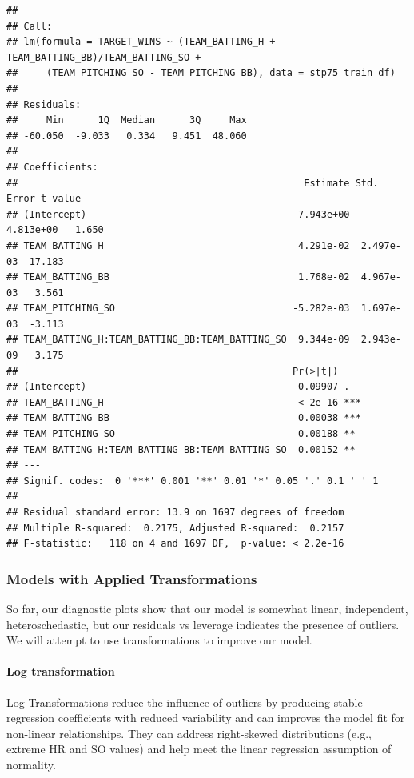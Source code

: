 \documentclass[
]{article}
\begin{document}
\begin{verbatim}
## 
## Call:
## lm(formula = TARGET_WINS ~ (TEAM_BATTING_H + TEAM_BATTING_BB)/TEAM_BATTING_SO + 
##     (TEAM_PITCHING_SO - TEAM_PITCHING_BB), data = stp75_train_df)
## 
## Residuals:
##     Min      1Q  Median      3Q     Max 
## -60.050  -9.033   0.334   9.451  48.060 
## 
## Coefficients:
##                                                  Estimate Std. Error t value
## (Intercept)                                     7.943e+00  4.813e+00   1.650
## TEAM_BATTING_H                                  4.291e-02  2.497e-03  17.183
## TEAM_BATTING_BB                                 1.768e-02  4.967e-03   3.561
## TEAM_PITCHING_SO                               -5.282e-03  1.697e-03  -3.113
## TEAM_BATTING_H:TEAM_BATTING_BB:TEAM_BATTING_SO  9.344e-09  2.943e-09   3.175
##                                                Pr(>|t|)    
## (Intercept)                                     0.09907 .  
## TEAM_BATTING_H                                  < 2e-16 ***
## TEAM_BATTING_BB                                 0.00038 ***
## TEAM_PITCHING_SO                                0.00188 ** 
## TEAM_BATTING_H:TEAM_BATTING_BB:TEAM_BATTING_SO  0.00152 ** 
## ---
## Signif. codes:  0 '***' 0.001 '**' 0.01 '*' 0.05 '.' 0.1 ' ' 1
## 
## Residual standard error: 13.9 on 1697 degrees of freedom
## Multiple R-squared:  0.2175, Adjusted R-squared:  0.2157 
## F-statistic:   118 on 4 and 1697 DF,  p-value: < 2.2e-16
\end{verbatim}

\subsubsection{Models with Applied
Transformations}\label{models-with-applied-transformations}

So far, our diagnostic plots show that our model is somewhat linear,
independent, heteroschedastic, but our residuals vs leverage indicates
the presence of outliers. We will attempt to use transformations to
improve our model.

\paragraph{Log transformation}\label{log-transformation}

Log Transformations reduce the influence of outliers by producing stable
regression coefficients with reduced variability and can improves the
model fit for non-linear relationships. They can address right-skewed
distributions (e.g., extreme HR and SO values) and help meet the linear
regression assumption of normality.
\end{document}
